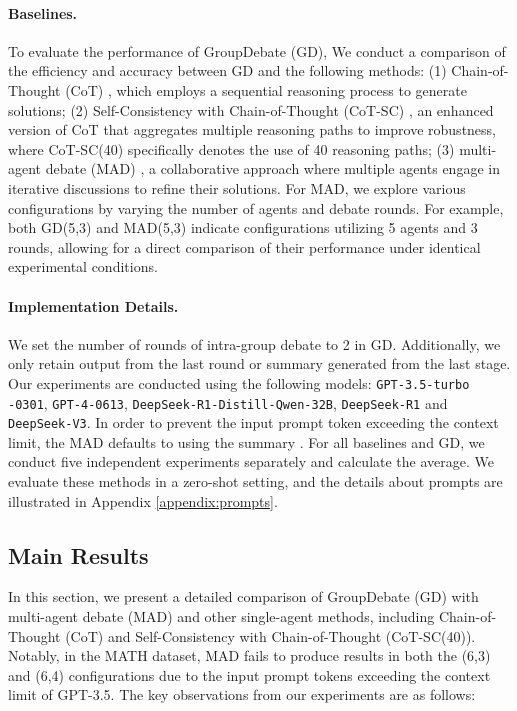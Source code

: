 \paragraph{Baselines.} To evaluate the performance of GroupDebate (GD), We conduct a comparison of the efficiency and accuracy between GD and the following methods: (1) Chain-of-Thought (CoT) \cite{wei2023chainofthought}, which employs a sequential reasoning process to generate solutions; 
(2) Self-Consistency with Chain-of-Thought (CoT-SC) \cite{wang2023selfconsistency}, an enhanced version of CoT that aggregates multiple reasoning paths to improve robustness, where CoT-SC(40) specifically denotes the use of 40 reasoning paths; (3) multi-agent debate (MAD) \cite{liang2023encouraging}, a collaborative approach where multiple agents engage in iterative discussions to refine their solutions. For MAD, we explore various configurations by varying the number of agents and debate rounds. For example, both GD(5,3) and MAD(5,3) indicate configurations utilizing 5 agents and 3 rounds, allowing for a direct comparison of their performance under identical experimental conditions.

\paragraph{Implementation Details.} We set the number of rounds of intra-group debate to 2 in GD. Additionally, we only retain output from the last round or summary generated from the last stage. Our experiments are conducted using the following models: \texttt{GPT-3.5-turbo} \texttt{-0301}, \texttt{GPT-4-0613}, \texttt{DeepSeek-R1-Distill-Qwen-32B}, \texttt{DeepSeek-R1} and \texttt{DeepSeek-V3}. In order to prevent the input prompt token exceeding the context limit, the MAD defaults to using the summary \cite{du2023improving}. For all baselines and GD, we conduct five independent experiments separately and calculate the average. We evaluate these methods in a zero-shot setting, and the details about prompts are illustrated in Appendix \ref{appendix:prompts}.

\subsection{Main Results} \label{sec:exp-main-res}

In this section, we present a detailed comparison of GroupDebate (GD) with multi-agent debate (MAD) and other single-agent methods, including Chain-of-Thought (CoT) and Self-Consistency with Chain-of-Thought (CoT-SC(40)).  Notably, in the MATH dataset, MAD fails to produce results in both the (6,3) and (6,4) configurations due to the input prompt tokens exceeding the context limit of GPT-3.5. The key observations from our experiments are as follows: 
